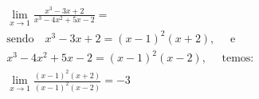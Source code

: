 \begin{ex}
\begin{align}
&\lim_{x\rightarrow 1} \frac{x^3-3x+2}{x^3-4x^2+5x-2}=\nonumber\\
&\text{sendo}\quad x^3-3x+2=(x-1)^2(x+2),\quad\text{ e }\nonumber\\
&x^3-4x^2+5x-2=(x-1)^2(x-2),\quad\text{ temos: }\nonumber\\
&\lim_{x\rightarrow 1} \frac{(x-1)^2(x+2)}{(x-1)^2(x-2)}=-3\nonumber
\end{align}
\end{ex}
